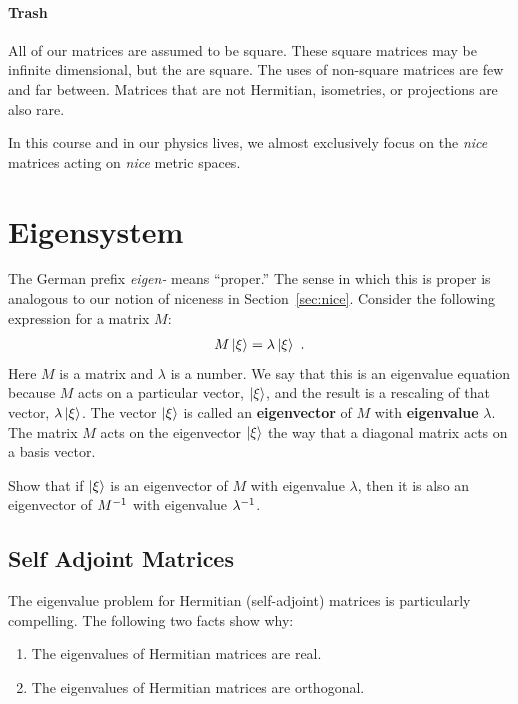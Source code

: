 \documentclass[12pt]{article}
\begin{document}
\paragraph{Trash} All of our matrices are assumed to be square. These square matrices may be infinite dimensional, but the are square. The uses of non-square matrices are few and far between. Matrices that are not Hermitian, isometries, or projections are also rare. 


In this course and in our physics lives, we almost exclusively focus on the \emph{nice} matrices acting on \emph{nice} metric spaces. 



\section{Eigensystem}
\label{sec:eigensystem}

The German prefix \emph{eigen-} means ``proper.'' The sense in which this is proper is analogous to our notion of niceness in Section~\ref{sec:nice}. Consider the following expression for a matrix $M$:
\begin{align}
    M\left|\xi\right\rangle = \lambda\left|\xi\right\rangle \ .
\end{align}
Here $M$ is a matrix and $\lambda$ is a number. We say that this is an eigenvalue equation because $M$ acts on a particular vector, $\left|\xi\right\rangle$, and the result is a rescaling of that vector, $\lambda\left|\xi\right\rangle$. The vector $\left|\xi\right\rangle$ is called an \textbf{eigenvector} of $M$ with \textbf{eigenvalue} $\lambda$.  The matrix $M$ acts on the eigenvector $\left|\xi\right\rangle$ the way that a diagonal matrix acts on a basis vector.
 
\begin{exercise}
Show that if $\left|\xi\right\rangle$ is an eigenvector of $M$ with eigenvalue $\lambda$, then it is also an eigenvector of $M^{-1}$ with eigenvalue $\lambda^{-1}$. 
\end{exercise}

\subsection{Self Adjoint Matrices}

The eigenvalue problem for Hermitian (self-adjoint) matrices is particularly compelling. The following two facts show why:
\begin{enumerate}
    \item The eigenvalues of Hermitian matrices are real.
    \item The eigenvalues of Hermitian matrices are orthogonal.
\end{enumerate}
\end{document}
